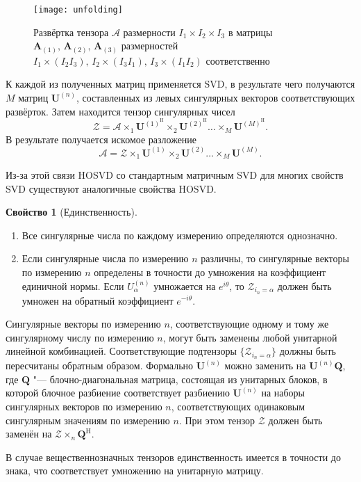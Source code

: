 \documentclass[specialist,
    substylefile = spbu_report.rtx,
    subf,href,colorlinks=true, 12pt]{disser}
\theoremstyle{plain}
\theoremstyle{definition}
\newtheorem{property}{Свойство}[section]
\theoremstyle{remark}
\begin{document}
    \begin{figure}[!h]
        \centering
        \texttt{[image: unfolding]}
        \caption{Развёртка тензора $\mathcal{A}$ размерности $I_1\times I_2 \times I_3$ в матрицы $\mathbf{A}_{(1)},\,
        \mathbf{A}_{(2)},\, \mathbf{A}_{(3)}$ размерностей $I_1\times (I_2 I_3),\, I_2\times (I_3 I_1),\, I_3\times (I_1 I_2)$
            соответственно}
        \label{fig:unfolding}
    \end{figure}

    К каждой из полученных матриц применяется SVD, в результате чего получаются $M$ матриц $\mathbf{U}^{(n)}$,
    составленных из левых сингулярных векторов соответствующих развёрток.
    Затем находится тензор сингулярных чисел
    \[\mathcal{Z}=\mathcal{A}\times_1 \mathbf{U}^{(1)^\mathrm{H}}\times_2 \mathbf{U}^{(2)^\mathrm{H}}\ldots \times_M
    \mathbf{U}^{(M)^\mathrm{H}}.\]
    В результате получается искомое разложение
    \[\mathcal{A} = \mathcal{Z}\times_1 \mathbf{U}^{(1)}\times_2 \mathbf{U}^{(2)}\ldots \times_M \mathbf{U}^{(M)}.\]

    Из-за этой связи HOSVD со стандартным матричным SVD для многих свойств SVD существуют аналогичные свойства HOSVD\@.
    \begin{property}[Единственность]
        \leavevmode
        \begin{enumerate}
            \item Все сингулярные числа по каждому измерению определяются однозначно.
            \item Если сингулярные числа по измерению $n$ различны, то сингулярные векторы по измерению $n$ определены
            в точности до умножения на коэффициент единичной нормы.
            Если $U_\alpha^{(n)}$ умножается на $e^{i\theta}$, то $\mathcal{Z}_{i_n=\alpha}$ должен быть умножен на обратный
            коэффициент $e^{-i\theta}$.
        \end{enumerate}
        Сингулярные векторы по измерению $n$, соответствующие одному и тому же сингулярному числу по измерению $n$,
        могут быть заменены любой унитарной линейной комбинацией.
        Соответствующие подтензоры $\{\mathcal{Z}_{i_n=\alpha}\}$ должны быть пересчитаны обратным образом.
        Формально $\mathbf{U}^{(n)}$ можно заменить на $\mathbf{U}^{(n)}\mathbf{Q}$, где $\mathbf{Q}$ "--- блочно-диагональная
        матрица, состоящая из унитарных блоков, в которой блочное разбиение соответствует разбиению $\mathbf{U}^{(n)}$
        на наборы сингулярных векторов по измерению $n$, соответствующих одинаковым сингулярным значениям по измерению $n$.
        При этом тензор $\mathcal{Z}$ должен быть заменён на $\mathcal{Z}\times_{n} \mathbf{Q}^{\mathrm{H}}$.

        В случае вещественнозначных тензоров единственность имеется в точности до знака, что соответствует
        умножению на унитарную матрицу.
    \end{property}
\end{document}
